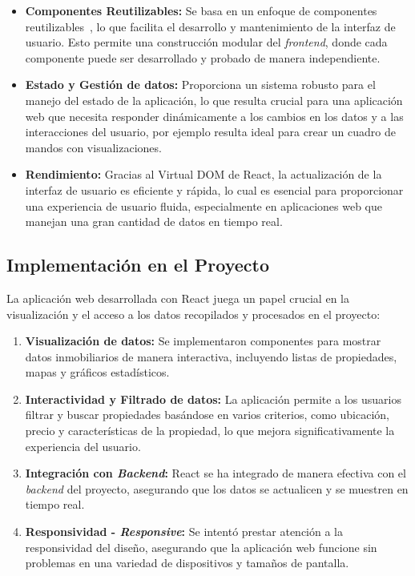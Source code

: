 \begin{itemize}
    \item \textbf{Componentes Reutilizables:} Se basa en un enfoque de componentes reutilizables~\cite{react_components}, lo que facilita el desarrollo y mantenimiento de la interfaz de usuario. Esto permite una construcción modular del \textit{frontend}, donde cada componente puede ser desarrollado y probado de manera independiente.

    \item \textbf{Estado y Gestión de datos:} Proporciona un sistema robusto para el manejo del estado de la aplicación, lo que resulta crucial para una aplicación web que necesita responder dinámicamente a los cambios en los datos y a las interacciones del usuario, por ejemplo resulta ideal para crear un cuadro de mandos con visualizaciones.

    \item \textbf{Rendimiento:} Gracias al Virtual DOM de React, la actualización de la interfaz de usuario es eficiente y rápida, lo cual es esencial para proporcionar una experiencia de usuario fluida, especialmente en aplicaciones web que manejan una gran cantidad de datos en tiempo real.

\end{itemize}

\subsection{Implementación en el Proyecto}

La aplicación web desarrollada con React juega un papel crucial en la visualización y el acceso a los datos recopilados y procesados en el proyecto:

\begin{enumerate}
    \item \textbf{Visualización de datos:} Se implementaron componentes para mostrar datos inmobiliarios de manera interactiva, incluyendo listas de propiedades, mapas y gráficos estadísticos.

    \item \textbf{Interactividad y Filtrado de datos:} La aplicación permite a los usuarios filtrar y buscar propiedades basándose en varios criterios, como ubicación, precio y características de la propiedad, lo que mejora significativamente la experiencia del usuario.

    \item \textbf{Integración con \textit{Backend}:} React se ha integrado de manera efectiva con el \textit{backend} del proyecto, asegurando que los datos se actualicen y se muestren en tiempo real.

    \item \textbf{Responsividad - \textit{Responsive}:} Se intentó prestar atención a la responsividad del diseño, asegurando que la aplicación web funcione sin problemas en una variedad de dispositivos y tamaños de pantalla.
\end{enumerate}

